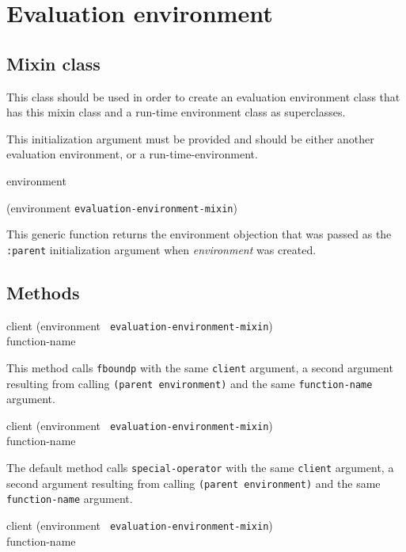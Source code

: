\chapter{Evaluation environment}

\section{Mixin class}


This class should be used in order to create an evaluation environment
class that has this mixin class and a run-time environment class as
superclasses.


This initialization argument must be provided and should be either
another evaluation environment, or a run-time-environment.

 {environment}

 {(environment {\tt evaluation-environment-mixin})}

This generic function returns the environment objection that was passed
as the \texttt{:parent} initialization argument when
\textit{environment} was created.

\section{Methods}

{\small{} {client (environment {\tt
      evaluation-environment-mixin}) \\ function-name}
}

This method calls \texttt{fboundp} with the same \texttt{client} argument, a
second argument resulting from calling \texttt{(parent environment)} and the
same \texttt{function-name} argument.

{\small{} {client (environment {\tt
      evaluation-environment-mixin}) \\ function-name}
}

The default method calls \texttt{special-operator} with the same
\texttt{client} argument, a second argument resulting from calling
\texttt{(parent environment)} and the same \texttt{function-name} argument.

{\small{} {client (environment {\tt
      evaluation-environment-mixin}) \\ function-name}
}

